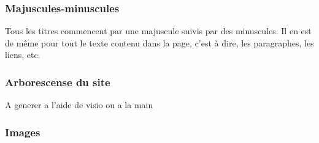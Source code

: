 \documentclass[letter, 11pt]{report}
\begin{document}
\subsubsection{Majuscules-minuscules}

Tous les titres commencent par une majuscule suivis par des minuscules. Il en est de même pour tout le texte contenu dans la page, c'est à dire, les paragraphes, les liens, etc.

\subsubsection{Arborescense du site}

A generer a l'aide de visio ou a la main

\subsubsection{Images}
\end{document}
